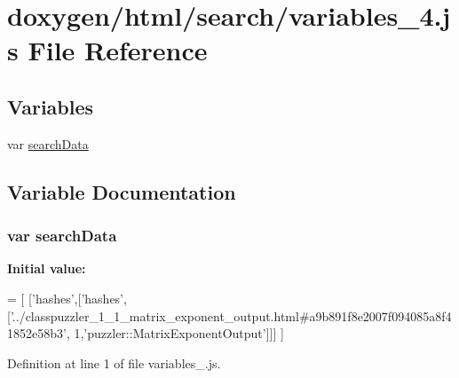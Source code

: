 \hypertarget{a00108}{}\section{doxygen/html/search/variables\+\_\+4.js File Reference}
\label{a00108}
\subsection*{Variables}
\begin{DoxyCompactItemize}
\item 
var \hyperlink{a00108_ad01a7523f103d6242ef9b0451861231e}{search\+Data}
\end{DoxyCompactItemize}


\subsection{Variable Documentation}
\hypertarget{a00108_ad01a7523f103d6242ef9b0451861231e}{}
\subsubsection[{search\+Data}]{\setlength{\rightskip}{0pt plus 5cm}var search\+Data}\label{a00108_ad01a7523f103d6242ef9b0451861231e}
{\bfseries Initial value\+:}
\begin{DoxyCode}
=
[
  [\textcolor{stringliteral}{'hashes'},[\textcolor{stringliteral}{'hashes'},[\textcolor{stringliteral}{'../classpuzzler\_1\_1\_matrix\_exponent\_output.html#a9b891f8e2007f094085a8f41852e58b3'},
      1,\textcolor{stringliteral}{'puzzler::MatrixExponentOutput'}]]]
]
\end{DoxyCode}


Definition at line 1 of file variables\+\_.\+js.

